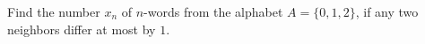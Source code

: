 Find the number $x_n$ of $n$-words from the alphabet $A = \{0, 1, 2\}$, if any two neighbors differ at most by $1$.
